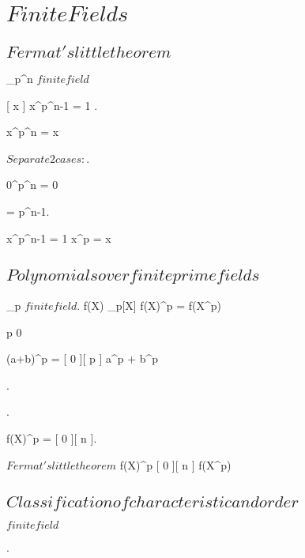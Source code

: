 \documentclass[a5paper]{book}
\begin{document}
\section{ $ Finite Fields $ }
{

	\subsection{ $ Fermat's little theorem $ }
	
	{
		\F_{p^n} $ finite field $
	}
	\proposition
	{
		[ x  ]
		{
			x^{p^n-1} = 1
		}.

		{
			x^{p^n} = x
		}
	}
	\demonstration
	{
		$ Separate 2 cases: $.
		
		{
			0^{p^n} = 0
		}
		{
			 \divides {} = p^n-1.

			x^{p^n-1} = 1 \imp x^p = x
		}
	}
	\newpage

	\subsection{ $ Polynomials over finite prime fields $ }
	
	{
		\F_p $ finite field $.
		f(X) \in \F_p[X]
	}
	\proposition
	{
		f(X)^p = f(X^p)
	}
	\demonstration
	{
		{
			p \divides {} \imp {}  0 
		}

		{
			(a+b)^p = [ 0 ][ p ]  a^p + b^p
		}

		 \in \N.

		.

		f(X)^p = [ 0 ][ n ].

		$Fermat's little theorem$ \imp f(X)^p  [ 0 ][ n ]  f(X^p) 
	}
	\newpage
	

	\subsection{ $ Classification of characteristic and order $ }
	
	{
		\F $ finite field $
	}
	\proposition
	{
		.

}}
\end{document}
